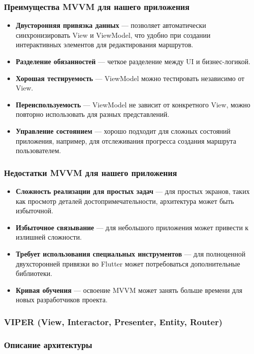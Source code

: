 \subsubsection*{Преимущества MVVM для нашего приложения}
\begin{itemize}
    \item \textbf{Двусторонняя привязка данных} — позволяет автоматически синхронизировать View и ViewModel, что удобно при создании интерактивных элементов для редактирования маршрутов.
    \item \textbf{Разделение обязанностей} — четкое разделение между UI и бизнес-логикой.
    \item \textbf{Хорошая тестируемость} — ViewModel можно тестировать независимо от View.
    \item \textbf{Переиспользуемость} — ViewModel не зависит от конкретного View, можно повторно использовать для разных представлений.
    \item \textbf{Управление состоянием} — хорошо подходит для сложных состояний приложения, например, для отслеживания прогресса создания маршрута пользователем.
\end{itemize}

\subsubsection*{Недостатки MVVM для нашего приложения}
\begin{itemize}
    \item \textbf{Сложность реализации для простых задач} — для простых экранов, таких как просмотр деталей достопримечательности, архитектура может быть избыточной.
    \item \textbf{Избыточное связывание} — для небольшого приложения может привести к излишней сложности.
    \item \textbf{Требует использования специальных инструментов} — для полноценной двухсторонней привязки во Flutter может потребоваться дополнительные библиотеки.
    \item \textbf{Кривая обучения} — освоение MVVM может занять больше времени для новых разработчиков проекта.
\end{itemize}

\subsubsection*{VIPER (View, Interactor, Presenter, Entity, Router)}

\subsubsection*{Описание архитектуры}


